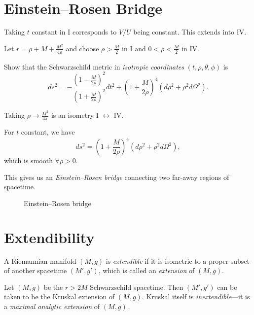 
\section{Einstein--Rosen Bridge}%
\label{sec:einstein_rosen_bridge}

Taking $t$ constant in I corresponds to $V / U$ being constant. This extends into IV.

Let $r = \rho + M + \frac{M^2}{4 \rho}$ and choose $\rho > \frac{M}{2}$ in I and $0 < \rho < \frac{M}{2}$ in IV.
\begin{figure}[tbhp]
  \centering
  \def\svgwidth{0.4\columnwidth}
  
  \caption{}
  \label{fig:l6f1}
\end{figure}
\begin{exercise}
  Show that the Schwarzschild metric in \emph{isotropic coordinates} $(t, \rho, \theta, \phi)$  is
  \begin{equation}
    ds^2 = -\frac{\left( 1 - \frac{M}{2\rho} \right)^2}{\left( 1 + \frac{M}{2 \rho} \right)^2} dt^2 + \left( 1 + \frac{M}{2\rho} \right)^4 (d\rho^2 + \rho^2 d\Omega^2).
  \end{equation}
\end{exercise}

Taking $\rho \to \frac{M^2}{4 \pi}$ is an isometry I $\leftrightarrow$ IV.

For $t$ constant, we have 
\begin{equation}
  ds^2 = \left( 1 + \frac{M}{2\rho} \right)^4 (d\rho^2 + \rho^2 d\Omega^2),
\end{equation}
which is smooth $\forall \rho > 0$.

This gives us an \emph{Einstein--Rosen bridge} connecting two far-away regions of spacetime.
\begin{figure}[tbhp]
  \centering
  \def\svgwidth{0.4\columnwidth}
  
  \caption{Einstein--Rosen bridge}
  \label{fig:l6f2}
\end{figure}

\section{Extendibility}%
\label{sec:extendibility}

\begin{definition}[extendible]
  A Riemannian manifold $(M, g)$ is \emph{extendible} if it is isometric to a proper subset of another spacetime $(M', g')$, which is called an \emph{extension} of $(M, g)$.
\end{definition}
\begin{example}[]
  Let $(M, g)$ be the $r> 2M$ Schwarzschild spacetime.
  Then $(M', g')$ can be taken to be the Kruskal extension of $(M, g)$.
  Kruskal itself is \emph{inextendible}---it is a \emph{maximal analytic extension} of $(M, g)$.
\end{example}

